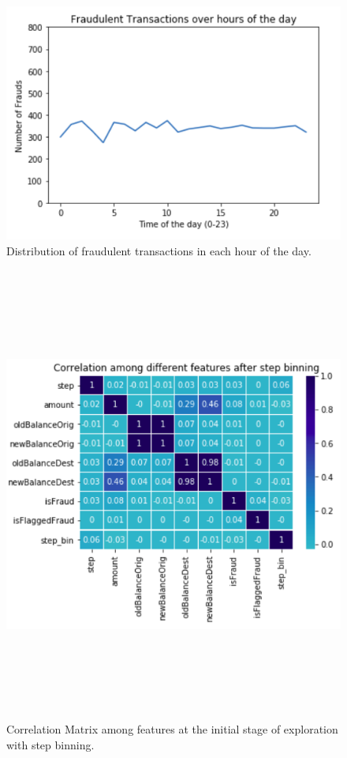 \documentclass[letterpaper, 12 pt, conference]{ieeeconf}  %
\begin{document}
\begin{figure}
    \centering
    \includegraphics[width=\linewidth]{fraudvtime.png}
    \caption{Distribution of fraudulent transactions in each hour of the day.}
    \label{fig:distribution}
\end{figure}

\begin{figure}
    \centering
    \includegraphics[width=15cm,height=15cm,keepaspectratio]{correlation_matrix.png}
    \caption{Correlation Matrix among features at the initial stage of exploration with step binning.}
    \label{fig:correlation_matrix_before}
\end{figure}
\end{document}
